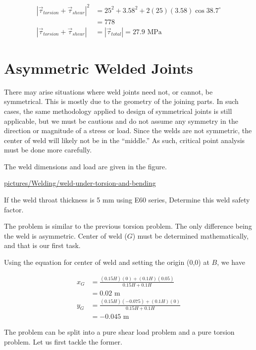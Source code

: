 \documentclass[a4paper,openany,12pt]{book}
\begin{document}
{{$$\begin{aligned}
    \left| \vec{\tau}_{torsion} + \vec{\tau}_{shear} \right|^2 &= 25^2 + 3.58^2 + 2(25)(3.58) \cos 38.7^{\circ} \\
                                                               &= 778 \\
    \left| \vec{\tau}_{torsion} + \vec{\tau}_{shear} \right| &= \left| \vec{\tau}_{total} \right| = 27.9 \text{ MPa}                                                        
  \end{aligned}$$

\section{Asymmetric Welded Joints}
\label{asymmetric-welded-joints}
There may arise situations where weld joints need not, or cannot, be
symmetrical. This is mostly due to the geometry of the joining parts. In
such cases, the same methodology applied to design of symmetrical joints
is still applicable, but we must be cautious and do not assume any
symmetry in the direction or magnitude of a stress or load. Since the
welds are not symmetric, the center of weld will likely not be in the
``middle.'' As such, critical point analysis must be done more carefully.

The weld dimensions and load are given in the figure.

\url{pictures/Welding/weld-under-torsion-and-bending}

If the weld throat thickness is 5 mm using E60 series, Determine this
weld safety factor.

The problem is similar to the previous torsion problem. The only
difference being the weld is asymmetric. Center of weld (\(G\)) must be
determined mathematically, and that is our first task.

Using the equation for center of weld and setting the origin (0,0) at
\(B\), we have

$$\begin{aligned}
    x_G &= \frac{(0.15H)(0) + (0.1H)(0.05)}{ 0.15H + 0.1H } \\
        &= 0.02 \text{ m} \\
    y_G &= \frac{(0.15H)(-0.075) + (0.1H)(0)}{ 0.15H + 0.1H } \\
        &= -0.045 \text{ m} 
  \end{aligned}$$

The problem can be split into a pure shear load problem and a pure
torsion problem. Let us first tackle the former.

}}
\end{document}
